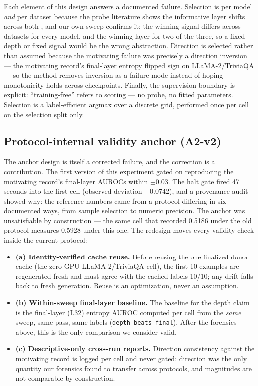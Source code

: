 Each element of this design answers a documented failure. Selection is per model \emph{and} per dataset because the probe literature shows the informative layer shifts across both \citep{Azaria2023Internal}, and our own sweep confirms it: the winning signal differs across datasets for every model, and the winning layer for two of the three, so a fixed depth or fixed signal would be the wrong abstraction. Direction is selected rather than assumed because the motivating failure was precisely a direction inversion --- the motivating record's final-layer entropy flipped sign on LLaMA-2/TriviaQA --- so the method removes inversion as a failure mode instead of hoping monotonicity holds across checkpoints. Finally, the supervision boundary is explicit: ``training-free'' refers to scoring --- no probe, no fitted parameters. Selection is a label-efficient argmax over a discrete grid, performed once per cell on the selection split only.

\subsection{Protocol-internal validity anchor (A2-v2)}
\label{sec:anchor}

The anchor design is itself a corrected failure, and the correction is a contribution. The first version of this experiment gated on reproducing the motivating record's final-layer AUROCs within $\pm$0.03. The halt gate fired 47 seconds into the first cell (observed deviation +0.0742), and a provenance audit showed why: the reference numbers came from a protocol differing in six documented ways, from sample selection to numeric precision. The anchor was unsatisfiable by construction --- the same cell that recorded 0.5186 under the old protocol measures 0.5928 under this one. The redesign moves every validity check inside the current protocol:

\begin{itemize}
\item \textbf{(a) Identity-verified cache reuse.} Before reusing the one finalized donor cache (the zero-GPU LLaMA-2/TriviaQA cell), the first 10 examples are regenerated fresh and must agree with the cached labels 10/10; any drift falls back to fresh generation. Reuse is an optimization, never an assumption.
\item \textbf{(b) Within-sweep final-layer baseline.} The baseline for the depth claim is the final-layer (L32) entropy AUROC computed per cell from the \emph{same} sweep, same pass, same labels (\texttt{depth\_beats\_final}). After the forensics above, this is the only comparison we consider valid.
\item \textbf{(c) Descriptive-only cross-run reports.} Direction consistency against the motivating record is logged per cell and never gated: direction was the only quantity our forensics found to transfer across protocols, and magnitudes are not comparable by construction.
\end{itemize}


